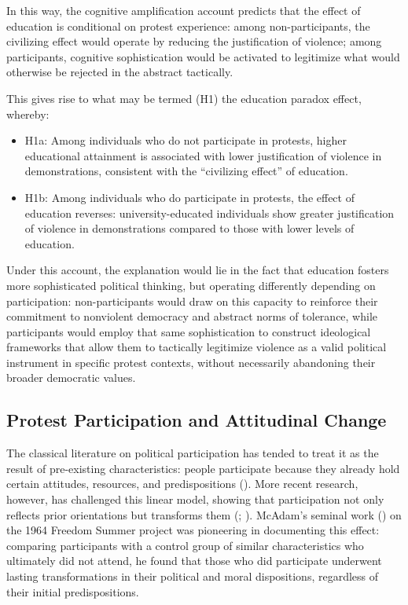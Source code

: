 \documentclass[
  13pt,
]{article}
\begin{document}
In this way, the cognitive amplification account predicts that the
effect of education is conditional on protest experience: among
non-participants, the civilizing effect would operate by reducing the
justification of violence; among participants, cognitive sophistication
would be activated to legitimize what would otherwise be rejected in the
abstract tactically.

This gives rise to what may be termed (H1) the education paradox effect,
whereby:

\begin{itemize}
\item
  H1a: Among individuals who do not participate in protests, higher
  educational attainment is associated with lower justification of
  violence in demonstrations, consistent with the ``civilizing effect''
  of education.
\item
  H1b: Among individuals who do participate in protests, the effect of
  education reverses: university-educated individuals show greater
  justification of violence in demonstrations compared to those with
  lower levels of education.
\end{itemize}

Under this account, the explanation would lie in the fact that education
fosters more sophisticated political thinking, but operating differently
depending on participation: non-participants would draw on this capacity
to reinforce their commitment to nonviolent democracy and abstract norms
of tolerance, while participants would employ that same sophistication
to construct ideological frameworks that allow them to tactically
legitimize violence as a valid political instrument in specific protest
contexts, without necessarily abandoning their broader democratic
values.

\subsection{Protest Participation and Attitudinal
Change}\label{protest-participation-and-attitudinal-change}

The classical literature on political participation has tended to treat
it as the result of pre-existing characteristics: people participate
because they already hold certain attitudes, resources, and
predispositions ().
More recent research, however, has challenged this linear model, showing
that participation not only reflects prior orientations but transforms
them (;
). McAdam's
seminal work () on the 1964 Freedom Summer project was pioneering in documenting
this effect: comparing participants with a control group of similar
characteristics who ultimately did not attend, he found that those who
did participate underwent lasting transformations in their political and
moral dispositions, regardless of their initial predispositions.
\end{document}
